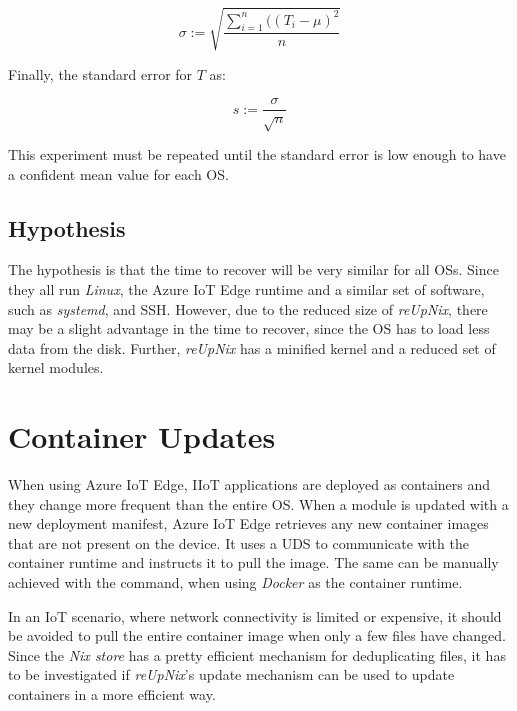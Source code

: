 \begin{equation}
   \sigma := \sqrt{\frac{\sum_{i=1}^{n}((T_i - \mu)^2}{n}}
\end{equation}

\noindent
Finally, the standard error for $T$ as:

\begin{equation}
    s := \frac{\sigma}{\sqrt{n}}
\end{equation}

\noindent
This experiment must be repeated until the standard error is low enough
to have a confident mean value for each \ac{OS}.

\subsection{Hypothesis}
The hypothesis is that the time to recover will be very similar for all
\ac{OS}s. Since they all run \textit{Linux}, the Azure IoT Edge runtime and
a similar set of software, such as \textit{systemd}, and \ac{SSH}. However, due
to the reduced size of \textit{reUpNix}, there may be a slight advantage in the
time to recover, since the \ac{OS} has to load less data from the disk. Further,
\textit{reUpNix} has a minified kernel and a reduced set of kernel modules.

\section{Container Updates}
\label{sec:container-updates}
When using Azure IoT Edge, \ac{IIoT} applications are deployed as containers and
they change more frequent than the entire \ac{OS}. When a module is updated
with a new deployment manifest, Azure IoT Edge retrieves any new container
images that are not present on the device. It uses a \ac{UDS} to communicate
with the container runtime and instructs it to pull the image. The same can be
manually achieved with the  command, when using \textit{Docker}
as the container runtime.

In an \ac{IoT} scenario, where network connectivity is limited or expensive,
it should be avoided to pull the entire container image when only a few files have
changed. Since the \textit{Nix store} has a pretty efficient mechanism for
deduplicating files, it has to be investigated if \textit{reUpNix}'s
update mechanism can be used to update containers in a more efficient way.

